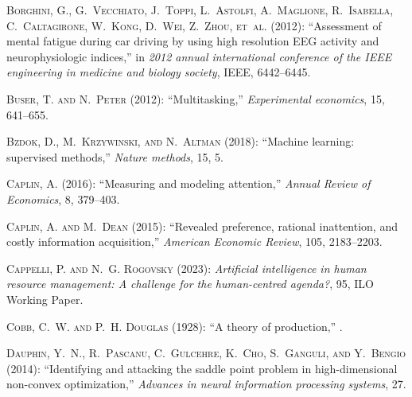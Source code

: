 \begin{thebibliography}{1}
\textsc{Borghini, G., G.~Vecchiato, J.~Toppi, L.~Astolfi, A.~Maglione, R.~Isabella, C.~Caltagirone, W.~Kong, D.~Wei, Z.~Zhou, et~al.} (2012): \enquote{Assessment of mental fatigue during car driving by using high resolution EEG activity and neurophysiologic indices,} in \emph{2012 annual international conference of the IEEE engineering in medicine and biology society}, IEEE, 6442--6445.

\textsc{Buser, T. and N.~Peter} (2012): \enquote{Multitasking,} \emph{Experimental economics}, 15, 641--655.

\textsc{Bzdok, D., M.~Krzywinski, and N.~Altman} (2018): \enquote{Machine learning: supervised methods,} \emph{Nature methods}, 15, 5.

\textsc{Caplin, A.} (2016): \enquote{Measuring and modeling attention,} \emph{Annual Review of Economics}, 8, 379--403.

\textsc{Caplin, A. and M.~Dean} (2015): \enquote{Revealed preference, rational inattention, and costly information acquisition,} \emph{American Economic Review}, 105, 2183--2203.

\textsc{Cappelli, P. and N.~G. Rogovsky} (2023): \emph{Artificial intelligence in human resource management: A challenge for the human-centred agenda?}, 95, ILO Working Paper.

\textsc{Cobb, C.~W. and P.~H. Douglas} (1928): \enquote{A theory of production,} .

\textsc{Dauphin, Y.~N., R.~Pascanu, C.~Gulcehre, K.~Cho, S.~Ganguli, and Y.~Bengio} (2014): \enquote{Identifying and attacking the saddle point problem in high-dimensional non-convex optimization,} \emph{Advances in neural information processing systems}, 27.


\end{thebibliography}
